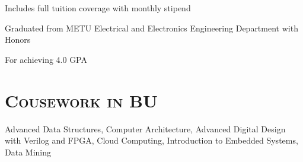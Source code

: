 \begin{resume}
	\begin{position}
		Includes full tuition coverage with monthly stipend
	\end{position}
	
	\begin{position}
		Graduated from METU Electrical and Electronics Engineering Department with
    Honors 
	\end{position}
	
	
	
	\begin{position}
		For achieving 4.0 GPA
	\end{position}
	
	
	
	\section{\textsc{Cousework in BU}}
	
	Advanced Data Structures, Computer Architecture, Advanced Digital Design with
	Verilog and FPGA, Cloud Computing, Introduction to Embedded Systems, Data Mining
	
	
	
	
	

\end{resume}
